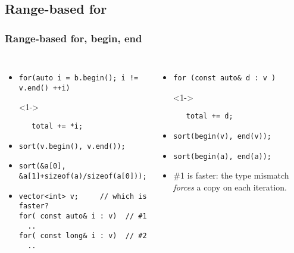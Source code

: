 
\subsection{Range-based for} \lyxframeend{}


\begin{frame}[fragile]
\frametitle{Range-based for, begin, end}

\begin{columns}[t]

\begin{itemize}
\item  <1->{\scriptsize\begin{verbatim}for(auto i = b.begin(); i != v.end() ++i)   \end{verbatim}}
\item[]<1->{\scriptsize\begin{verbatim}   total += *i; \end{verbatim}}
\item<2->{\scriptsize\begin{verbatim}sort(v.begin(), v.end());  \end{verbatim}}
\item<2->{\scriptsize\begin{verbatim}sort(&a[0], &a[1]+sizeof(a)/sizeof(a[0]));  \end{verbatim}}

\item<3-> {\scriptsize
\begin{verbatim}
vector<int> v;     // which is faster?
for( const auto& i : v)  // #1
  ..
for( const long& i : v)  // #2
  ..
\end{verbatim}
}

\end{itemize}

\begin{itemize}
\item  <1->{\scriptsize\begin{verbatim}for (const auto& d : v )  \end{verbatim}}
\item[]<1->{\scriptsize\begin{verbatim}   total += d; \end{verbatim}}
\item<2->{\scriptsize\begin{verbatim}sort(begin(v), end(v));  \end{verbatim}}
\item<2->{\scriptsize\begin{verbatim}sort(begin(a), end(a));  \end{verbatim}}
\item<4-> \#1 is faster: the type mismatch \emph{forces} a copy on each iteration.
\end{itemize}

\end{columns}







\end{frame}

